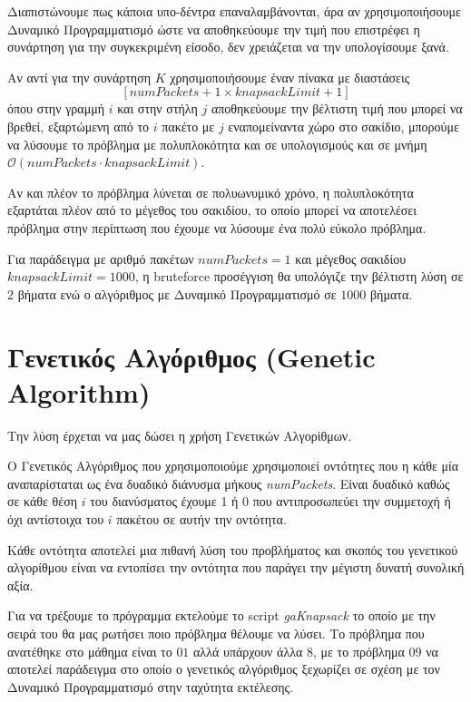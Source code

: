 \documentclass{article}
\begin{document}
Διαπιστώνουμε πως κάποια υπο-δέντρα επαναλαμβάνονται, άρα αν χρησιμοποιήσουμε
Δυναμικό Προγραμματισμό ώστε να αποθηκεύουμε την τιμή που επιστρέφει η συνάρτηση
για την συγκεκριμένη είσοδο, δεν χρειάζεται να την υπολογίσουμε ξανά.

Αν αντί για την συνάρτηση $K$ χρησιμοποιήσουμε έναν πίνακα με διαστάσεις
\begin{equation*}
\left[\textit{numPackets}+1 \times \textit{knapsackLimit}+1\right]
\end{equation*}
όπου στην γραμμή $i$ και στην στήλη $j$ αποθηκεύουμε την βέλτιστη τιμή που
μπορεί να βρεθεί, εξαρτώμενη από το $i$ πακέτο με $j$ εναπομείναντα χώρο στο
σακίδιο, μπορούμε να λύσουμε το πρόβλημα με πολυπλοκότητα και σε υπολογισμούς
και σε μνήμη $\mathcal{O}\left(\textit{numPackets} \cdot
\textit{knapsackLimit}\right)$.

Αν και πλέον το πρόβλημα λύνεται σε πολυωνυμικό χρόνο, η πολυπλοκότητα εξαρτάται
πλέον από το μέγεθος του σακιδίου, το οποίο μπορεί να αποτελέσει πρόβλημα στην
περίπτωση που έχουμε να λύσουμε ένα πολύ εύκολο πρόβλημα.

Για παράδειγμα με αριθμό πακέτων $\textit{numPackets} = 1$ και μέγεθος σακιδίου
$\textit{knapsackLimit} = 1000$, η bruteforce προσέγγιση θα υπολόγιζε την
βέλτιστη λύση σε 2 βήματα ενώ ο αλγόριθμος με Δυναμικό Προγραμματισμό σε $1000$
βήματα.

\section{Γενετικός Αλγόριθμος (Genetic Algorithm)}

Την λύση έρχεται να μας δώσει η χρήση Γενετικών Αλγορίθμων.

Ο Γενετικός Αλγόριθμος που χρησιμοποιούμε χρησιμοποιεί οντότητες που η κάθε μία
αναπαρίσταται ως ένα δυαδικό διάνυσμα μήκους \textit{numPackets}. Είναι δυαδικό
καθώς σε κάθε θέση $i$ του διανύσματος έχουμε 1 ή 0 που αντιπροσωπεύει την
συμμετοχή ή όχι αντίστοιχα του $i$ πακέτου σε αυτήν την οντότητα.

Κάθε οντότητα αποτελεί μια πιθανή λύση του προβλήματος και σκοπός του γενετικού
αλγορίθμου είναι να εντοπίσει την οντότητα που παράγει την μέγιστη δυνατή
συνολική αξία.

Για να τρέξουμε το πρόγραμμα εκτελούμε το script \textit{gaKnapsack} το οποίο με
την σειρά του θα μας ρωτήσει ποιο πρόβλημα θέλουμε να λύσει. Το πρόβλημα που
ανατέθηκε στο μάθημα είναι το $01$ αλλά υπάρχουν άλλα $8$, με το πρόβλημα $09$
να αποτελεί παράδειγμα στο οποίο ο γενετικός αλγόριθμος ξεχωρίζει σε σχέση με
τον Δυναμικό Προγραμματισμό στην ταχύτητα εκτέλεσης.
\end{document}
